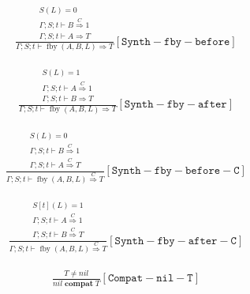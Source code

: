 \documentclass{scrartcl}
\DeclareMathOperator{\fby}{fby}
\DeclareMathOperator{\compat}{\mathbf{compat}}
\begin{document}
    \begin{align*}
    \frac{
        \begin{matrix}
        S(L) = 0 \\
        \Gamma; S; t \vdash B \overset{C}{\Rightarrow} 1 \\
        \Gamma; S; t \vdash A \Rightarrow T
        \end{matrix}
    }{
        \Gamma; S; t \vdash \fby(A, B, L) \Rightarrow T
    }[\mathtt{Synth-fby-before}]
    \end{align*}
    
    \begin{align*}
    \frac{
        \begin{matrix}
        S(L) = 1 \\
        \Gamma; S; t \vdash A \overset{C}{\Rightarrow} 1 \\
        \Gamma; S; t \vdash B \Rightarrow T
        \end{matrix}
    }{
        \Gamma; S; t \vdash \fby(A, B, L) \Rightarrow T
    }[\mathtt{Synth-fby-after}]
    \end{align*}
    
    \begin{align*}
    \frac{
        \begin{matrix}
        S(L) = 0 \\
        \Gamma; S; t \vdash B \overset{C}{\Rightarrow} 1 \\
        \Gamma; S; t \vdash A \overset{C}{\Rightarrow} T
        \end{matrix}
    }{
        \Gamma; S; t \vdash \fby(A, B, L) \overset{C}{\Rightarrow} T
    }[\mathtt{Synth-fby-before-C}]
    \end{align*}
    
    \begin{align*}
    \frac{
        \begin{matrix}
        S[t](L) = 1 \\
        \Gamma; S; t \vdash A \overset{C}{\Rightarrow} 1 \\
        \Gamma; S; t \vdash B \overset{C}{\Rightarrow} T
        \end{matrix}
    }{
        \Gamma; S; t \vdash \fby(A, B, L) \overset{C}{\Rightarrow} T
    }[\mathtt{Synth-fby-after-C}]
    \end{align*}
    
    \begin{align*}
    \frac{
        T \neq nil
    }{
        nil \compat T
    }[\mathtt{Compat-nil-T}]
    \end{align*}
    
\end{document}
